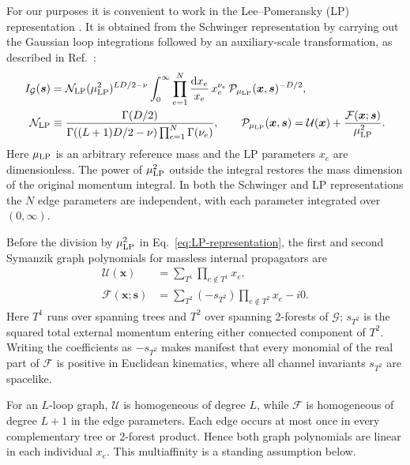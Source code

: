 \documentclass[a4paper,11pt]{article}
\newcommand{\x}{\boldsymbol{x}}
\newcommand{\s}{\boldsymbol{s}}
\newcommand{\dd}{\mathrm d}
\begin{document}
For our purposes it is convenient to work in the Lee--Pomeransky (LP)
representation \cite{Lee:2013hzt}.  It is obtained from the Schwinger
representation by carrying out the Gaussian loop integrations followed by
an auxiliary-scale transformation, as described in
Ref.~\cite[App.~B]{Gardi:2022khw}:
\begin{equation}
\begin{aligned}
 I_{\mathcal G}(\s)
 &=\mathcal N_{\rm LP}
 (\mu_{\rm LP}^2)^{LD/2-\nu}
 \int_0^\infty
 \prod_{e=1}^{N}\frac{\dd x_e}{x_e}\,x_e^{\nu_e}\,
 \mathcal P_{\mu_{\rm LP}}(\x,\s)^{-D/2},\\
 \mathcal N_{\rm LP}
 &\equiv
 {\Gamma(D/2)\over
  \Gamma\!\left((L+1)D/2-\nu\right)
 \prod_{e=1}^{N}\Gamma(\nu_e)},
 \qquad
 \mathcal P_{\mu_{\rm LP}}(\x,\s)
 =\mathcal U(\x)+\frac{\mathcal F(\x;\s)}{\mu_{\rm LP}^2}.
\end{aligned}
 \label{eq:LP-representation}
\end{equation}
Here \(\mu_{\rm LP}\) is an arbitrary reference mass and the LP parameters
\(x_e\) are dimensionless.  The power of \(\mu_{\rm LP}^2\) outside the
integral restores the mass dimension of the original momentum integral.
In both the Schwinger and LP representations the \(N\) edge parameters are
independent,
with each parameter integrated over \((0,\infty)\).

Before the division by \(\mu_{\rm LP}^2\) in
Eq.~\eqref{eq:LP-representation}, the first and second Symanzik graph
polynomials for massless internal propagators are
\cite{Weinzierl:2022eaz}
\begin{equation}
\begin{aligned}
 \mathcal U(\x)
 &=\sum_{T^1}\prod_{e\notin T^1}x_e,\\
 \mathcal F(\x;\s)
 &=\sum_{T^2}(-s_{T^2})\prod_{e\notin T^2}x_e-i0.
\end{aligned}
 \label{eq:graph-polynomials}
\end{equation}
Here \(T^1\) runs over spanning trees and \(T^2\) over spanning 2-forests of
\(\mathcal G\); \(s_{T^2}\) is the squared total external momentum entering
either connected component of \(T^2\).  Writing the coefficients as
\(-s_{T^2}\) makes manifest that every monomial
of the real part of \(\mathcal F\) is positive in Euclidean kinematics, where
all channel invariants \(s_{T^2}\) are spacelike.

For an \(L\)-loop graph, \(\mathcal U\) is homogeneous of degree \(L\), while
\(\mathcal F\) is homogeneous of degree \(L+1\) in the edge parameters.
Each edge occurs at most once in every complementary tree or 2-forest
product.  Hence both graph polynomials are linear in each individual
\(x_e\).  This multiaffinity is a standing assumption below.
\end{document}
